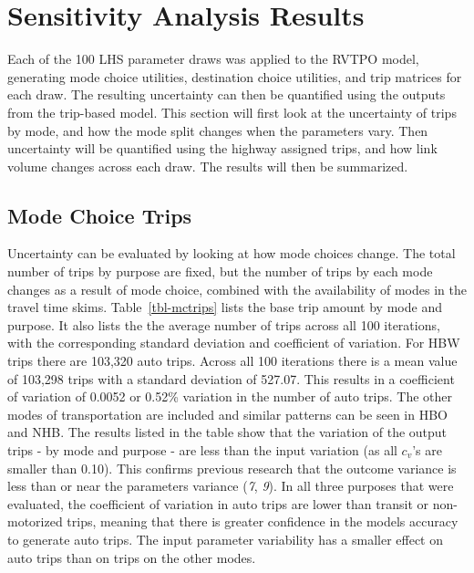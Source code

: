 \documentclass[
  letterpaper,
]{trb}
\begin{document}

\hypertarget{sec-results}{%
\section{Sensitivity Analysis Results}\label{sec-results}}

Each of the 100 LHS parameter draws was applied to the RVTPO model,
generating mode choice utilities, destination choice utilities, and trip
matrices for each draw. The resulting uncertainty can then be quantified
using the outputs from the trip-based model. This section will first
look at the uncertainty of trips by mode, and how the mode split changes
when the parameters vary. Then uncertainty will be quantified using the
highway assigned trips, and how link volume changes across each draw.
The results will then be summarized.

\hypertarget{mode-choice-trips}{%
\subsection{Mode Choice Trips}\label{mode-choice-trips}}

Uncertainty can be evaluated by looking at how mode choices change. The
total number of trips by purpose are fixed, but the number of trips by
each mode changes as a result of mode choice, combined with the
availability of modes in the travel time skims. Table~\ref{tbl-mctrips}
lists the base trip amount by mode and purpose. It also lists the the
average number of trips across all 100 iterations, with the
corresponding standard deviation and coefficient of variation. For HBW
trips there are 103,320 auto trips. Across all 100 iterations there is a
mean value of 103,298 trips with a standard deviation of 527.07. This
results in a coefficient of variation of 0.0052 or 0.52\% variation in
the number of auto trips. The other modes of transportation are included
and similar patterns can be seen in HBO and NHB. The results listed in
the table show that the variation of the output trips - by mode and
purpose - are less than the input variation (as all \(c_v\)'s are
smaller than 0.10). This confirms previous research that the outcome
variance is less than or near the parameters variance (\emph{7},
\emph{9}). In all three purposes that were evaluated, the coefficient of
variation in auto trips are lower than transit or non-motorized trips,
meaning that there is greater confidence in the models accuracy to
generate auto trips. The input parameter variability has a smaller
effect on auto trips than on trips on the other modes.
\end{document}
